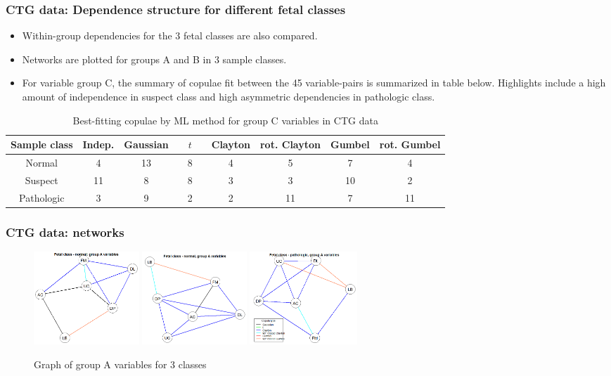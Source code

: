 \documentclass[handout,10pt]{beamer}
\begin{document}
\begin{frame}
\frametitle{CTG data: Dependence structure for different fetal classes}
\begin{itemize}
\item Within-group dependencies for the 3 fetal classes are also compared.
\item Networks are plotted for groups A and B in 3 sample classes.
\item For variable group C, the summary of copulae fit between the 45 variable-pairs is summarized in table below. Highlights include a high amount of independence in suspect class and high asymmetric dependencies in pathologic class.
\end{itemize}
\begin{scriptsize}
\begin{table}[h]\centering
    \begin{tabular}{|c||c|c|c|c|c|c|c|}
    \hline
    Sample class & Indep. & Gaussian & $\quad t\quad$ & Clayton & rot. Clayton & Gumbel & rot. Gumbel \\ \hline
    Normal & 4 & 13 & 8 & 4 & 5 & 7 & 4 \\
    Suspect & 11 & 8 & 8 & 3 & 3 & 10 & 2 \\
    Pathologic & 3 & 9 & 2 & 2 & 11 & 7 & 11 \\ \hline
    \end{tabular}
    \caption{Best-fitting copulae by ML method for group C variables in CTG data}
\end{table}
\end{scriptsize}
\end{frame}

\begin{frame}
\frametitle{CTG data: networks}
\begin{figure}[t]
	\centering
		\includegraphics[height=3.5cm]{ctgplot_1a.png}
		\includegraphics[height=3.5cm]{ctgplot_2a.png}
		\includegraphics[height=3.5cm]{ctgplot_3a.png}
	\label{fig:fig2}
	\caption{Graph of group A variables for 3 classes}
\end{figure}
\end{frame}
\end{document}
